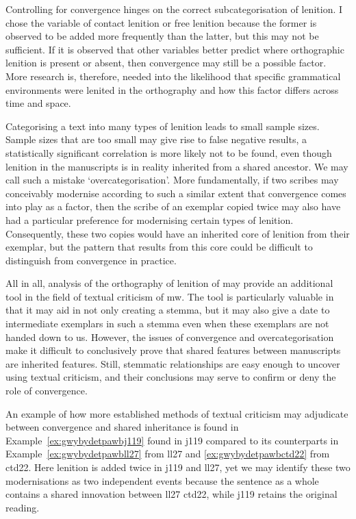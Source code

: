 Controlling for convergence hinges on the correct subcategorisation of lenition. I chose the variable of contact lenition or free lenition because the former is observed to be added more frequently than the latter, but this may not be sufficient. If it is observed that other variables better predict where orthographic lenition is present or absent, then convergence may still be a possible factor. More research is, therefore, needed into the likelihood that specific grammatical environments were lenited in the orthography and how this factor differs across time and space.

Categorising a text into many types of lenition leads to small sample sizes. Sample sizes that are too small may give rise to false negative results, \ie a statistically significant correlation is more likely not to be found, even though lenition in the manuscripts is in reality inherited from a shared ancestor. We may call such a mistake `overcategorisation'. More fundamentally, if two scribes may conceivably modernise according to such a similar extent that convergence comes into play as a factor, then the scribe of an exemplar copied twice may also have had a particular preference for modernising certain types of lenition. Consequently, these two copies would have an inherited core of lenition from their exemplar, but the pattern that results from this core could be difficult to distinguish from convergence in practice.

All in all, analysis of the orthography of lenition of  may provide an additional tool in the field of textual criticism of \gls{mw}. The tool is particularly valuable in that it may aid in not only creating a stemma, but it may also give a date to intermediate exemplars in such a stemma even when these exemplars are not handed down to us. However, the issues of convergence and overcategorisation make it difficult to conclusively prove that shared features between manuscripts are inherited features. Still, stemmatic relationships are easy enough to uncover using textual criticism, and their conclusions may serve to confirm or deny the role of convergence.

An example of how more established methods of textual criticism may adjudicate between convergence and shared inheritance is  found in Example~\ref{ex:gwybydetpawbj119} found in \gls{j119} compared to its counterparts in Example~\ref{ex:gwybydetpawbll27} from \gls{ll27} and \ref{ex:gwybydetpawbctd22} from \gls{ctd22}. Here lenition is added twice in \gls{j119} and \gls{ll27}, yet we may identify these two modernisations as two independent events  because the sentence as a whole contains a shared innovation between \gls{ll27} \gls{ctd22}, while \gls{j119} retains the original reading. 

